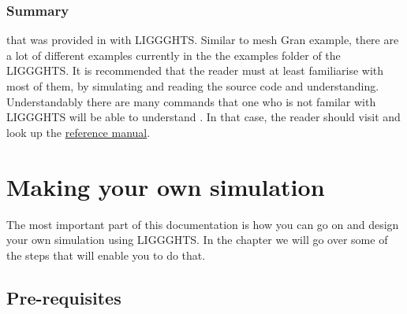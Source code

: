\documentclass{tufte-book} %
\begin{document}
  \subsection{Summary}

 that was provided in with LIGGGHTS. Similar to mesh Gran example, there are a lot of different examples currently in the the examples folder of the LIGGGHTS. It is recommended that the reader must at least familiarise with most of them, by simulating and reading the source code and understanding. Understandably there are many commands that one who is not familar with LIGGGHTS will be able to understand . In that case, the reader should visit and look up the \href{http://www.cfdem.com/media/DEM/docu/Manual.html}{reference manual}.

  

\chapter[Making your own Simulation]{Making your own simulation}
\label{chap:3}

\begin{fullwidth}
The most important part of this documentation is how you can go on and design your own simulation using LIGGGHTS. In the chapter we will go over some of the steps that will enable you to do that.
  
\end{fullwidth}

\section{Pre-requisites}
\end{document}
